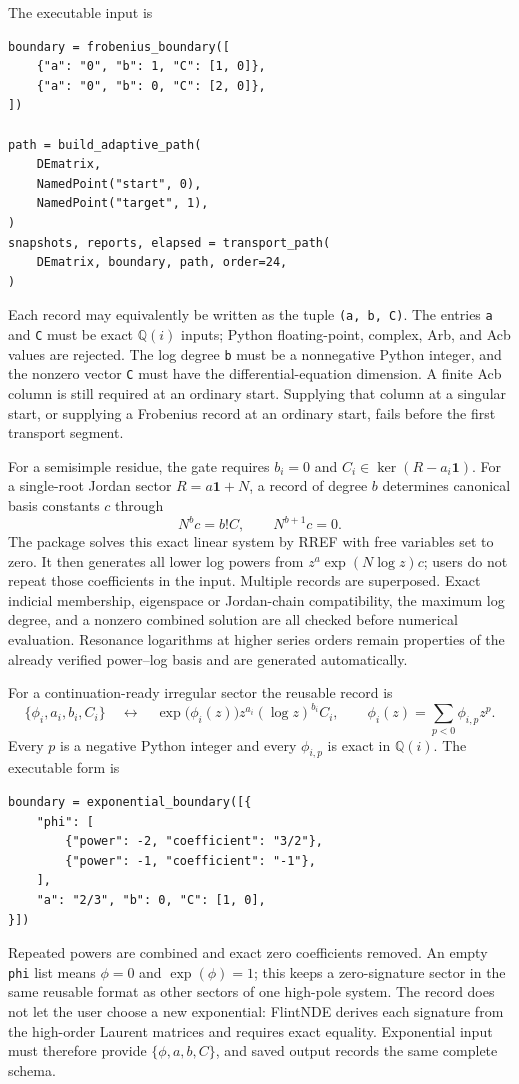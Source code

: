 \documentclass[11pt]{article}
\newcommand{\Id}{\mathbf 1}
\renewcommand{\_}{\origunderscore\allowbreak}
\begin{document}
The executable input is
\begin{verbatim}
boundary = frobenius_boundary([
    {"a": "0", "b": 1, "C": [1, 0]},
    {"a": "0", "b": 0, "C": [2, 0]},
])

path = build_adaptive_path(
    DEmatrix,
    NamedPoint("start", 0),
    NamedPoint("target", 1),
)
snapshots, reports, elapsed = transport_path(
    DEmatrix, boundary, path, order=24,
)
\end{verbatim}
Each record may equivalently be written as the tuple \texttt{(a, b, C)}.  The entries
\texttt{a} and \texttt{C} must be exact $\mathbb Q(i)$ inputs; Python floating-point,
complex, Arb, and Acb values are rejected.  The log degree \texttt{b} must be a nonnegative
Python integer, and the nonzero vector \texttt{C} must have the differential-equation
dimension.  A finite Acb column is still required at an ordinary start.  Supplying that
column at a singular start, or supplying a Frobenius record at an ordinary start, fails
before the first transport segment.

For a semisimple residue, the gate requires $b_i=0$ and
$C_i\in\ker(R-a_i\Id)$.  For a single-root Jordan sector
$R=a\Id+N$, a record of degree $b$ determines canonical basis constants $c$ through
\begin{equation}
  N^b c=b!C,
  \qquad N^{b+1}c=0.
  \label{eq:frobenius-boundary-jordan-recovery}
\end{equation}
The package solves this exact linear system by RREF with free variables set to zero.  It
then generates all lower log powers from $z^a\exp(N\log z)c$; users do not repeat those
coefficients in the input.  Multiple records are superposed.  Exact indicial membership,
eigenspace or Jordan-chain compatibility, the maximum log degree, and a nonzero combined
solution are all checked before numerical evaluation.  Resonance logarithms at higher
series orders remain properties of the already verified power--log basis and are generated
automatically.

For a continuation-ready irregular sector the reusable record is
\begin{equation}
  \bigl\{\phi_i,a_i,b_i,C_i\bigr\}
  \quad\longleftrightarrow\quad
  \exp\!\bigl(\phi_i(z)\bigr)z^{a_i}(\log z)^{b_i}C_i,
  \qquad
  \phi_i(z)=\sum_{p<0}\phi_{i,p}z^p .
  \label{eq:exponential-boundary-record}
\end{equation}
Every $p$ is a negative Python integer and every $\phi_{i,p}$ is exact in
$\mathbb Q(i)$.  The executable form is
\begin{verbatim}
boundary = exponential_boundary([{
    "phi": [
        {"power": -2, "coefficient": "3/2"},
        {"power": -1, "coefficient": "-1"},
    ],
    "a": "2/3", "b": 0, "C": [1, 0],
}])
\end{verbatim}
Repeated powers are combined and exact zero coefficients removed.  An empty
\texttt{phi} list means $\phi=0$ and $\exp(\phi)=1$; this keeps a zero-signature sector in
the same reusable format as other sectors of one high-pole system.  The record does not let
the user choose a new exponential: FlintNDE derives each signature from the high-order
Laurent matrices and requires exact equality.  Exponential input must therefore provide
$\{\phi,a,b,C\}$, and saved output records the same complete schema.
\end{document}
